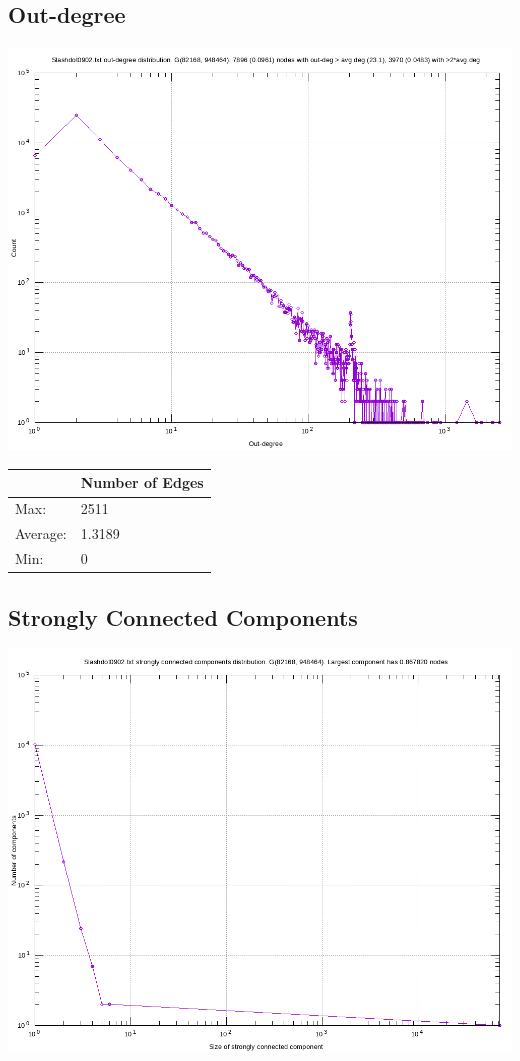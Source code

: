 \documentclass{subfiles}
\begin{document}
  \subsection{Out-degree}
  \includegraphics[scale=0.6]{OutDegDist.png}\\
  \begin{center}
  \begin{tabular}{|l|l|}
    \hline
    & Number of Edges\\
    \hline
    Max: & 2511\\
    \hline
    Average: & 1.3189\\
    \hline
    Min: & 0\\
    \hline
  \end{tabular}
  \end{center}

  \subsection{Strongly Connected Components}
  \includegraphics[scale=0.6]{SccDist}
\end{document}
